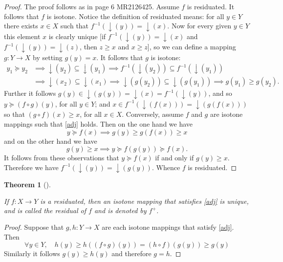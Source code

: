 \documentclass[
  letterpaper,
  10pt,
  reqno,
  twopage,
  openany]{book}
\theoremstyle{plain}
\theoremstyle{definition}
\theoremstyle{definition}
\theoremstyle{definition}
\theoremstyle{plain}
\theoremstyle{plain}
\newtheorem{theorem}{Theorem}[chapter]
\theoremstyle{remark}
\begin{document}
\begin{proof}

The proof follows as in page 6 MR2126425. Assume \(f\) is residuated. It
follows that \(f\) is isotone. Notice the definition of residuated
means: for all \(y\in Y\) there exists \(x\in X\) such that
\(f^{-1}({ \downarrow}(y)) = { \downarrow}(x)\). Now for every given
\(y\in Y\) this element \(x\) is clearly unique {[}if
\(f^{-1}({ \downarrow}(y))={ \downarrow}(x)\) and
\(f^{-1}({ \downarrow}(y))={ \downarrow}(z)\), then \(z\geq x\) and
\(x\geq z\){]}, so we can define a mapping \(g:Y\to X\) by setting
\(g(y)=x\). It follows that \(g\) is isotone:\\
\begin{align*}
y_1\succeq y_2 & \implies {\downarrow}(y_2) \subseteq {\downarrow}(y_1) \implies f^{-1}({\downarrow}(y_2)) \subseteq f^{-1}({\downarrow}(y_1)) \\
& \implies {\downarrow}(x_2) \subseteq {\downarrow}(x_1) \implies {\downarrow}(g(y_2))\subseteq {\downarrow}(g(y_1)) \implies g(y_1)\geq g(y_2).
\end{align*} Further it follows
\(g(y)\in {\downarrow}(g(y))= { \downarrow}(x)=f^{-1}({ \downarrow}(y))\),
and so \(y\succeq (f\circ g)(y)\), for all \(y\in Y\); and
\(x\in f^{-1}({\downarrow}(f(x)))={\downarrow}(g(f(x)))\) so that
\((g\circ f)(x)\geq x\), for all \(x\in X\). Conversely, assume \(f\)
and \(g\) are isotone mappings such that \eqref{adj} holds. Then on the
one hand we have \[
y\succeq f(x) \implies g(y)\geq g(f(x)) \geq x
\] and on the other hand we have \[
g(y) \geq x \implies y \succeq f(g(y)) \succeq f(x).
\] It follows from these observations that \(y\succeq f(x)\) if and only
if \(g(y)\geq x\). Therefore we have
\(f^{-1}({ \downarrow}(y))={\downarrow}(g(y))\). Whence \(f\) is
residuated.

\end{proof}

\leavevmode{}%
\begin{theorem}[]\label{thm-resuni}

If \(f:X\to Y\) is a residuated, then an isotone mapping that satisfies
\eqref{adj} is unique, and is called the \emph{residual} of \(f\) and is
denoted by \(f^+\).

\end{theorem}

\begin{proof}

Suppose that \(g, h:Y\to X\) are each isotone mappings that satisfy
\eqref{adj}. Then \[
\forall y\in Y, \quad  h(y)\geq h((f\circ g)(y)) = (h\circ f)(g(y))\geq g(y)
\] Similarly it follows \(g(y)\geq h(y)\) and therefore \(g=h\).

\end{proof}
\end{document}
